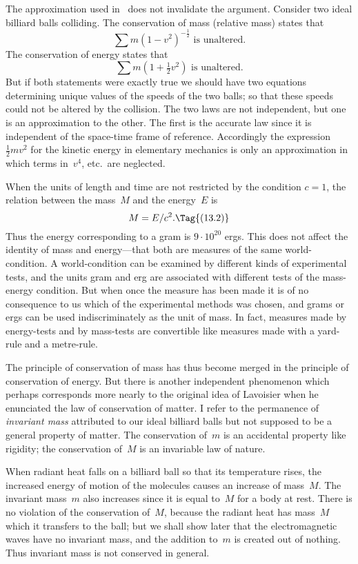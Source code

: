 \documentclass[12pt]{book}
\begin{document}
The approximation used in~ does not invalidate the argument.
Consider two ideal billiard balls colliding. The conservation of mass (relative
%
mass) states that
\[
\sum m (1 - v^{2})^{-\frac{1}{2}} \text{ is unaltered.}
\]
The conservation of energy states that
\[
\sum m (1 + \tfrac{1}{2}v^{2}) \text{ is unaltered.}
\]
But if both statements were exactly true we should have two equations
determining unique values of the speeds of the two balls; so that these speeds
could not be altered by the collision. The two laws are not independent, but
one is an approximation to the other. The first is the accurate law since it is
independent of the space-time frame of reference. Accordingly the expression
$\frac{1}{2}mv^{2}$ for the kinetic energy in elementary mechanics is only an approximation
in which terms in~$v^{4}$, etc.\ are neglected.

When the units of length and time are not restricted by the condition
$c = 1$, the relation between the mass~$M$ and the energy~$E$ is
\[
M = E/c^{2}.
\Tag{(13.2)}
\]
Thus the energy corresponding to a gram is $9 \cdot 10^{20}$ ergs. This does not
affect the identity of mass and energy---that both are measures of the same
world-condition. A world-condition can be examined by different kinds of
experimental tests, and the units gram and erg are associated with different
tests of the mass-energy condition. But when once the measure has been
made it is of no consequence to us which of the experimental methods was
chosen, and grams or ergs can be used indiscriminately as the unit of mass.
In fact, measures made by energy-tests and by mass-tests are convertible like
measures made with a yard-rule and a metre-rule.

The principle of conservation of mass has thus become merged in the
principle of conservation of energy. But there is another independent phenomenon
which perhaps corresponds more nearly to the original idea of Lavoisier
when he enunciated the law of conservation of matter. I refer to the permanence
of \emph{invariant mass} attributed to our ideal billiard balls but not
supposed to be a general property of matter. The conservation of~$m$ is an
%
%
accidental property like rigidity; the conservation of~$M$ is an invariable law
of nature.

When radiant heat falls on a billiard ball so that its temperature rises,
the increased energy of motion of the molecules causes an increase of mass~$M$.
The invariant mass~$m$ also increases since it is equal to~$M$ for a body at rest.
There is no violation of the conservation of~$M$, because the radiant heat has
mass~$M$ which it transfers to the ball; but we shall show later that the
electromagnetic waves have no invariant mass, and the addition to~$m$ is
created out of nothing. Thus invariant mass is not conserved in general.
\end{document}
